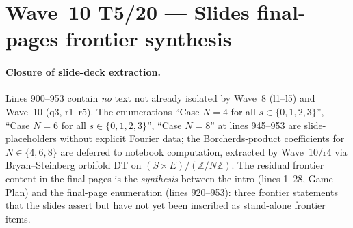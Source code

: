 
\providecommand{\kBKM}{\kappa_{\mathrm{BKM}}}
\providecommand{\kch}{\kappa_{\mathrm{ch}}}
\providecommand{\kcat}{\kappa_{\mathrm{cat}}}
\providecommand{\kfib}{\kappa_{\mathrm{fiber}}}
\providecommand{\gDelta}{\mathfrak{g}_{\Delta_5}}
\providecommand{\Hilb}{\mathrm{Hilb}}
\providecommand{\Pic}{\mathrm{Pic}}
\providecommand{\ZZ}{\mathbb{Z}}
\providecommand{\CC}{\mathbb{C}}
\providecommand{\ClaimStatusTheorem}{\textbf{[Theorem]}}
\providecommand{\ClaimStatusConjectured}{\textbf{[Conjectured]}}

\section*{Wave~10 T5/20 --- Slides final-pages frontier synthesis}
\label{sec:wave10-t5-slides-frontier-final}

\paragraph{Closure of slide-deck extraction.}
Lines 900--953 contain \emph{no} text not already isolated by Wave~8
(l1--l5) and Wave~10 (q3, r1--r5). The enumerations ``Case $N=4$ for
all $s\in\{0,1,2,3\}$'', ``Case $N=6$ for all $s\in\{0,1,2,3\}$'',
``Case $N=8$'' at lines 945--953 are slide-placeholders without
explicit Fourier data; the Borcherds-product coefficients for
$N\in\{4,6,8\}$ are deferred to notebook computation, extracted by
Wave~10/r4 via Bryan--Steinberg orbifold DT on
$(S\times E)/(\ZZ/N\ZZ)$. The residual frontier content in the
final pages is the \emph{synthesis} between the intro (lines 1--28,
Game Plan) and the final-page enumeration (lines 920--953): three
frontier statements that the slides assert but have not yet been
inscribed as stand-alone frontier items.

